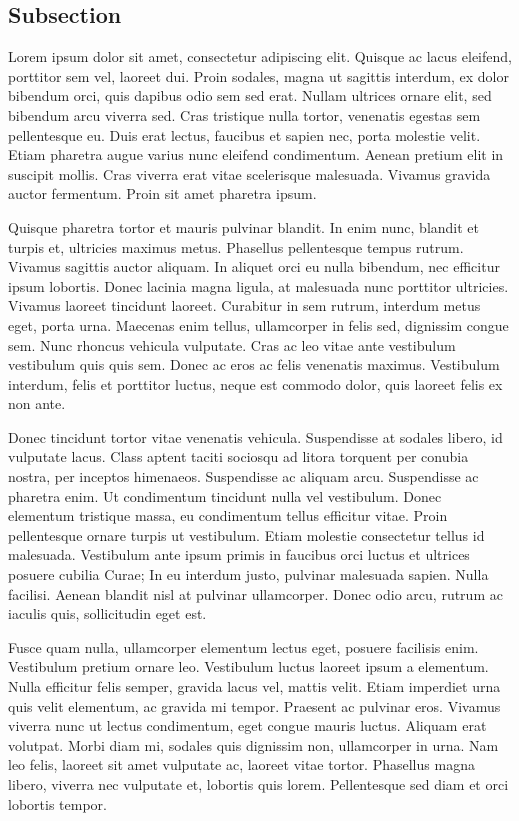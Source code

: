 \subsection{Subsection}



Lorem ipsum dolor sit amet, consectetur adipiscing elit. Quisque ac lacus eleifend, porttitor sem vel, laoreet dui. Proin sodales, magna ut sagittis interdum, ex dolor bibendum orci, quis dapibus odio sem sed erat. Nullam ultrices ornare elit, sed bibendum arcu viverra sed. Cras tristique nulla tortor, venenatis egestas sem pellentesque eu. Duis erat lectus, faucibus et sapien nec, porta molestie velit. Etiam pharetra augue varius nunc eleifend condimentum. Aenean pretium elit in suscipit mollis. Cras viverra erat vitae scelerisque malesuada. Vivamus gravida auctor fermentum. Proin sit amet pharetra ipsum.

Quisque pharetra tortor et mauris pulvinar blandit. In enim nunc, blandit et turpis et, ultricies maximus metus. Phasellus pellentesque tempus rutrum. Vivamus sagittis auctor aliquam. In aliquet orci eu nulla bibendum, nec efficitur ipsum lobortis. Donec lacinia magna ligula, at malesuada nunc porttitor ultricies. Vivamus laoreet tincidunt laoreet. Curabitur in sem rutrum, interdum metus eget, porta urna. Maecenas enim tellus, ullamcorper in felis sed, dignissim congue sem. Nunc rhoncus vehicula vulputate. Cras ac leo vitae ante vestibulum vestibulum quis quis sem. Donec ac eros ac felis venenatis maximus. Vestibulum interdum, felis et porttitor luctus, neque est commodo dolor, quis laoreet felis ex non ante.

Donec tincidunt tortor vitae venenatis vehicula. Suspendisse at sodales libero, id vulputate lacus. Class aptent taciti sociosqu ad litora torquent per conubia nostra, per inceptos himenaeos. Suspendisse ac aliquam arcu. Suspendisse ac pharetra enim. Ut condimentum tincidunt nulla vel vestibulum. Donec elementum tristique massa, eu condimentum tellus efficitur vitae. Proin pellentesque ornare turpis ut vestibulum. Etiam molestie consectetur tellus id malesuada. Vestibulum ante ipsum primis in faucibus orci luctus et ultrices posuere cubilia Curae; In eu interdum justo, pulvinar malesuada sapien. Nulla facilisi. Aenean blandit nisl at pulvinar ullamcorper. Donec odio arcu, rutrum ac iaculis quis, sollicitudin eget est.

Fusce quam nulla, ullamcorper elementum lectus eget, posuere facilisis enim. Vestibulum pretium ornare leo. Vestibulum luctus laoreet ipsum a elementum. Nulla efficitur felis semper, gravida lacus vel, mattis velit. Etiam imperdiet urna quis velit elementum, ac gravida mi tempor. Praesent ac pulvinar eros. Vivamus viverra nunc ut lectus condimentum, eget congue mauris luctus. Aliquam erat volutpat. Morbi diam mi, sodales quis dignissim non, ullamcorper in urna. Nam leo felis, laoreet sit amet vulputate ac, laoreet vitae tortor. Phasellus magna libero, viverra nec vulputate et, lobortis quis lorem. Pellentesque sed diam et orci lobortis tempor.
